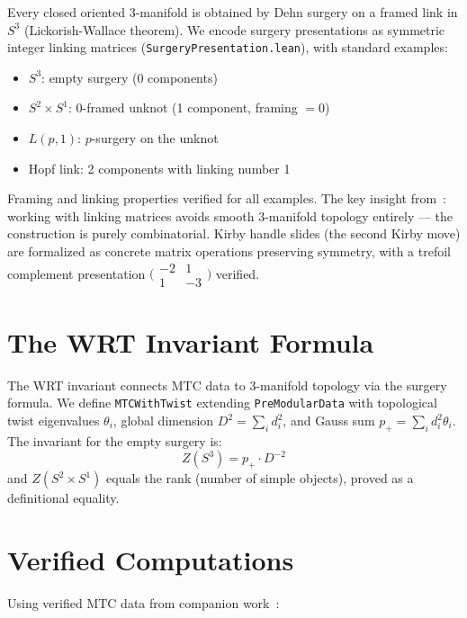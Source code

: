 \documentclass[aps,prl,twocolumn,superscriptaddress]{revtex4-2}
\newcommand{\lean}[1]{\texttt{#1}}
\begin{document}
Every closed oriented 3-manifold is obtained by Dehn surgery on a
framed link in $S^3$ (Lickorish-Wallace theorem). We encode surgery
presentations as symmetric integer linking matrices
(\lean{SurgeryPresentation.lean}), with standard examples:
\begin{itemize}
  \item $S^3$: empty surgery (0 components)
  \item $S^2 \times S^1$: 0-framed unknot (1 component, framing $= 0$)
  \item $L(p,1)$: $p$-surgery on the unknot
  \item Hopf link: 2 components with linking number 1
\end{itemize}
Framing and linking properties verified for all examples. The key
insight from~\cite{turaev2010}: working with linking matrices avoids
smooth 3-manifold topology entirely --- the construction is purely
combinatorial. Kirby handle slides (the second Kirby move) are
formalized as concrete matrix operations preserving symmetry, with a
trefoil complement presentation $\bigl(\begin{smallmatrix} -2 & 1 \\
1 & -3 \end{smallmatrix}\bigr)$ verified.

\section{The WRT Invariant Formula}

The WRT invariant connects MTC data to 3-manifold topology via the
surgery formula. We define \lean{MTCWithTwist} extending
\lean{PreModularData} with topological twist eigenvalues $\theta_i$,
global dimension $D^2 = \sum_i d_i^2$, and Gauss sum
$p_+ = \sum_i d_i^2 \theta_i$. The invariant for the empty surgery is:
\begin{equation}
  Z(S^3) = p_+ \cdot D^{-2}
\end{equation}
and $Z(S^2 \times S^1)$ equals the rank (number of simple objects),
proved as a definitional equality.

\section{Verified Computations}

Using verified MTC data from companion work~\cite{paper14}:
\end{document}

